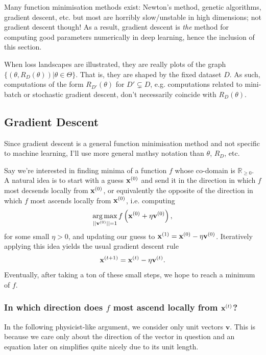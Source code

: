 \documentclass[11pt]{article}
\begin{document}
Many function minimisation methods exist: Newton's method, genetic algorithms, gradient descent, etc. but most are horribly slow/unstable in high dimensions; not gradient descent though! As a result, gradient descent is \textit{the} method for computing good parameters numerically in deep learning, hence the inclusion of this section.

\begin{tcolorbox}[title={\centering\textbf{Illustrations of loss landscapes are dataset-dependent!}}, colback=myLightBlue, colbacktitle=myDarkBlue, colframe=myDarkBlue, coltitle=white]
    When loss landscapes are illustrated, they are really plots of the graph $\{(\theta, R_D(\theta))|\theta\in\Theta\}$. That is, they are shaped by the fixed dataset $D$. As such, computations of the form $R_{D'}(\theta)$ for $D'\subsetneq D$, e.g. computations related to mini-batch or stochastic gradient descent, don't necessarily coincide with $R_D(\theta)$.
\end{tcolorbox}

\subsection{Gradient Descent}
Since gradient descent is a general function minimisation method and not specific to machine learning, I'll use more general mathsy notation than $\theta$, $R_D$, etc.

Say we're interested in finding minima of a function $f$ whose co-domain is $\mathbb{R}_{\geq0}$. A natural idea is to start with a guess $\mathbf{x}^{(0)}$ and send it in the direction in which $f$ most decsends locally from $\mathbf{x}^{(0)}$, or equivalently the opposite of the direction in which $f$ most ascends locally from $\mathbf{x}^{(0)}$, i.e. computing
$$
\operatorname*{arg\,max}_{||\mathbf{v}^{(0)}||=1}f\left(\mathbf{x}^{(0)}+\eta\mathbf{v}^{(0)}\right),
$$
for some small $\eta>0$, and updating our guess to $\mathbf{x}^{(1)}=\mathbf{x}^{(0)}-\eta\mathbf{v}^{(0)}$. Iteratively applying this idea yields the usual gradient descent rule
$$
\mathbf{x}^{(t+1)}
=
\mathbf{x}^{(t)}-\eta\mathbf{v}^{(t)}.
$$
Eventually, after taking a ton of these small steps, we hope to reach a minimum of $f$.

\subsubsection{In which direction does $f$ most ascend locally from $\mathbf{x}^{(t)}$?}
In the following physicist-like argument, we consider only unit vectors $\mathbf{v}$. This is because we care only about the direction of the vector in question and an equation later on simplifies quite nicely due to its unit length. 
\end{document}
